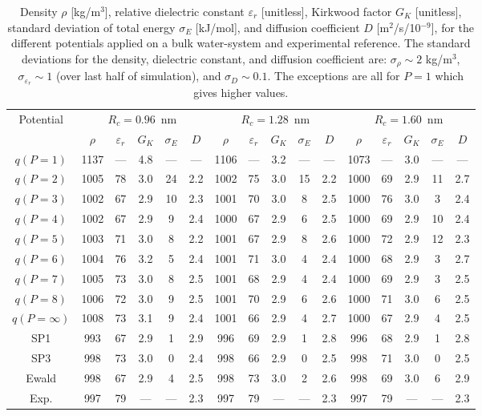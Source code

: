 \documentclass[
journal=jctcce,
manuscript=letter]{achemso}
\begin{document}
\begin{table}[ht]
    \centering
    \begin{tabular}{ c | c c c | c c | c c c | c c | c c c | c c |}
    \multirow{2}{*}{Potential} & \multicolumn{5}{c|}{$R_c=0.96$~nm} & \multicolumn{5}{c|}{$R_c=1.28$~nm} & \multicolumn{5}{c|}{$R_c=1.60$~nm} \\ & $\rho$ & $\varepsilon_r$ & $G_K$ & $\sigma_E$ & $D$ & $\rho$ & $\varepsilon_r$ & $G_K$ & $\sigma_E$ & $D$ & $\rho$ & $\varepsilon_r$ & $G_K$ & $\sigma_E$ & $D$ \\\hline
    $q(P=1)$ & 1137 & --- & 4.8 & --- & --- & 1106 & ---  & 3.2 & --- & --- & 1073 & --- & 3.0 & --- & --- \\
    $q(P=2)$ & 1005 & 78 & 3.0 & 24 & 2.2 & 1002 & 75 & 3.0 & 15 & 2.2 & 1000 & 69 & 2.9 & 11 & 2.7 \\
    $q(P=3)$ & 1002 & 67 & 2.9 & 10 & 2.3 & 1001 & 70 & 3.0 & 8 & 2.5 & 1000 & 76 & 3.0 & 3 & 2.4 \\
    $q(P=4)$ & 1002 & 67 & 2.9 & 9 & 2.4 & 1000 & 67 & 2.9 & 6 & 2.5 & 1000 & 69 & 2.9 & 10 & 2.4 \\
    $q(P=5)$ & 1003 & 71 & 3.0 & 8 & 2.2 & 1001 & 67 & 2.9 & 8 & 2.6 & 1000 & 72 & 2.9 & 12 & 2.3 \\
    $q(P=6)$ & 1004 & 76 & 3.2 & 5 & 2.4 & 1001 & 71 & 3.0 & 4 & 2.4 & 1000 & 68 & 2.9 & 3 & 2.7 \\
    $q(P=7)$ & 1005 & 73 & 3.0 & 8 & 2.5 & 1001 & 68 & 2.9 & 4 & 2.4 & 1000 & 69 & 2.9 & 3 & 2.5 \\
    $q(P=8)$ & 1006 & 72 & 3.0 & 9 & 2.5 & 1001 & 70 & 2.9 & 6 & 2.6 & 1000 & 71 & 3.0 & 6 & 2.5 \\
    $q(P=\infty)$ & 1008 & 73 & 3.1 & 9 & 2.4 & 1001 & 66 & 2.9 & 4 & 2.7 & 1000 & 67 & 2.9 & 4 & 2.5 \\\hline
    SP1 &   993 & 67 & 2.9 & 1 & 2.9 &   996 & 69 & 2.9 & 1 & 2.8 &   996 & 68 & 2.9 & 1 & 2.8 \\
    SP3 &   998 & 73 & 3.0 & 0 & 2.4 &   998 & 66 & 2.9 & 0 & 2.5 &   998 & 71 & 3.0 & 0 & 2.5 \\\hline
    Ewald & 998 & 67 & 2.9 & 4 & 2.5 & 998 & 73 & 3.0 & 2 & 2.6 & 998 & 69 & 3.0 & 6 & 2.9 \\
    \hline
    Exp. & 997 & 79 & --- & --- & 2.3 & 997 & 79 & --- & --- & 2.3 & 997 & 79 & --- & --- & 2.3 \\
    \end{tabular}
    \caption{Density $\rho$ [kg/m$^3$], relative dielectric constant $\varepsilon_r$ [unitless], Kirkwood factor $G_K$ [unitless], standard deviation of total energy $\sigma_E$ [kJ/mol], and diffusion coefficient $D$ [m$^2$/s/10$^{-9}$], for the different potentials applied on a bulk water-system and experimental reference\cite{harned1958physical,Mills1973Self}.
    The standard deviations for the density, dielectric constant, and diffusion coefficient are: $\sigma_{\rho} \sim 2$ kg/m$^3$, $\sigma_{\varepsilon_r} \sim 1$ (over last half of simulation), and $\sigma_D \sim 0.1$. The exceptions are all for $P=1$ which gives higher values.}
    \label{tbl:dente}
\end{table}
\end{document}
